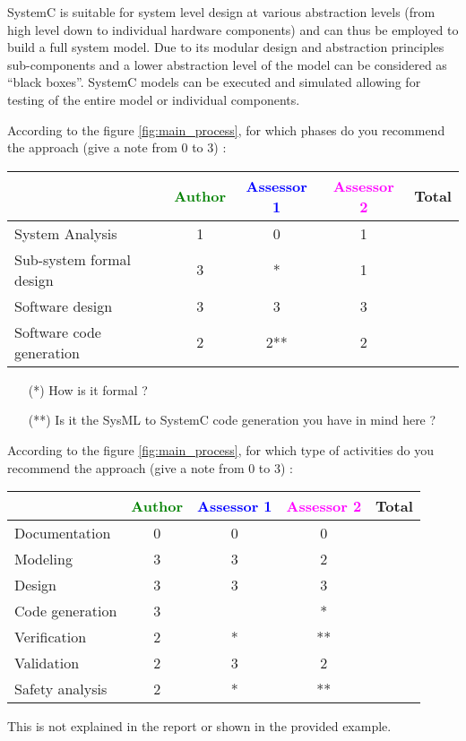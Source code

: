 SystemC is suitable for system level design at various abstraction levels (from high level down to individual hardware components) and can thus be employed to build a full system model. Due to its modular design and abstraction principles sub-components and a lower abstraction level of the model can be considered as ``black boxes''. SystemC models can be executed and simulated allowing for testing of the entire model or individual components.

According to the figure \ref{fig:main_process}, for which phases do you recommend the approach (give a note from 0 to 3) :

\begin{tabular}{|l | c | c | c | c|}
\hline
& \textcolor{green}{Author} & \textcolor{blue}{Assessor 1} & \textcolor{magenta}{Assessor 2} & Total \\
\hline
System Analysis &1 & 0 & 1 & \\
\hline
Sub-system formal design & 3 & *  &  1 & \\
\hline
Software design &3 &3 & 3 & \\
\hline
Software code generation &2 & 2** & 2 & \\
\hline
\end{tabular}
\begin{assessor1}
\begin{itemize}
\item[(*)] How is it formal ?
\item[(**)] Is it the SysML to  SystemC code generation  you have in
  mind here ?
\end{itemize}
\end{assessor1}

According to the figure \ref{fig:main_process}, for which type of activities do you recommend the approach (give a note from 0 to 3) :

\begin{tabular}{|l | c | c | c | c|}
\hline
& \textcolor{green}{Author} & \textcolor{blue}{Assessor 1} & \textcolor{magenta}{Assessor 2} & Total \\
\hline
Documentation &0 & 0 & 0 & \\
\hline
Modeling &3 & 3 & 2 & \\
\hline
Design &3 &3 & 3 & \\
\hline
Code generation &3 &  & * & \\
\hline
Verification &2 &* & ** & \\
\hline
Validation &2 &3 & 2 & \\
\hline
Safety analysis &2 &* & ** & \\
\hline
\end{tabular}
\begin{assessor1}
This is not explained in the report or shown in  the provided example.
\end{assessor1}

